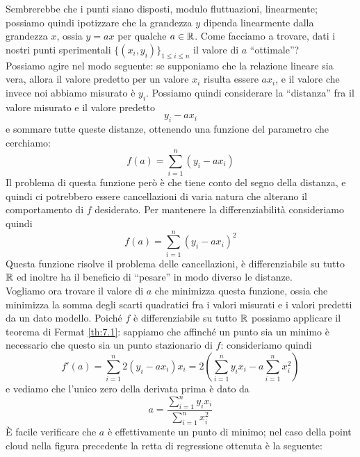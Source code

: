 Sembrerebbe che i punti siano disposti, modulo fluttuazioni, linearmente; possiamo quindi ipotizzare che la grandezza $y$ dipenda linearmente dalla grandezza $x$, ossia $y=ax$ per qualche $a\in\amsbb{R}$. Come facciamo a trovare, dati i nostri punti sperimentali $\{(x_i, y_i)\}_{1\le i\le n}$ il valore di $a$ ``ottimale''? \\
Possiamo agire nel modo seguente: se supponiamo che la relazione lineare sia vera, allora il valore predetto per un valore $x_i$ risulta essere $ax_i$, e il valore che invece noi abbiamo misurato è $y_i$. Possiamo quindi considerare la ``distanza'' fra il valore misurato e il valore predetto
\[
y_i - ax_i
\]
e sommare tutte queste distanze, ottenendo una funzione del parametro che cerchiamo:
\[
f(a) = \sum_{i=1}^n (y_i-ax_i)
\]
Il problema di questa funzione però è che tiene conto del segno della distanza, e quindi ci potrebbero essere cancellazioni di varia natura che alterano il comportamento di $f$ desiderato. Per mantenere la differenziabilità consideriamo quindi
\[
f(a) = \sum_{i=1}^n(y_i-a x_i)^2
\]
Questa funzione risolve il problema delle cancellazioni, è differenziabile su tutto $\amsbb{R}$ ed inoltre ha il beneficio di ``pesare'' in modo diverso le distanze.\\
Vogliamo ora trovare il valore di $a$ che minimizza questa funzione, ossia che minimizza la somma degli scarti quadratici fra i valori misurati e i valori predetti da un dato modello. Poiché $f$ è differenziabile su tutto $\amsbb{R}$ possiamo applicare il teorema di Fermat \ref{th:7.1}: sappiamo che affinché un punto sia un minimo è necessario che questo sia un punto stazionario di $f$: consideriamo quindi
\[
f'(a) = \sum_{i=1}^n 2(y_i-ax_i)x_i = 2\left(\sum_{i=1}^n y_i x_i -a\sum_{i=1}^n x_i^2\right)
\]
e vediamo che l'unico zero della derivata prima è dato da
\[
a = \frac{\sum_{i=1}^n y_i x_i}{\sum_{i=1}^n x_i^2}
\]
\`E facile verificare che $a$ è effettivamente un punto di minimo; nel caso della point cloud nella figura precedente la retta di regressione ottenuta è la seguente:
